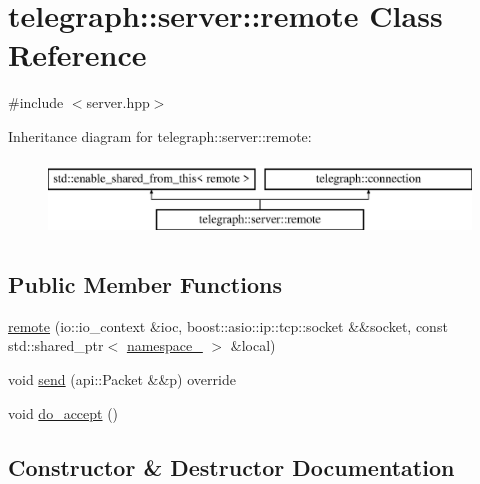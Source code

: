 \hypertarget{classtelegraph_1_1server_1_1remote}{}\section{telegraph\+:\+:server\+:\+:remote Class Reference}
\label{classtelegraph_1_1server_1_1remote}


{\ttfamily \#include $<$server.\+hpp$>$}

Inheritance diagram for telegraph\+:\+:server\+:\+:remote\+:\begin{figure}[H]
\begin{center}
\leavevmode
\includegraphics[height=2.000000cm]{classtelegraph_1_1server_1_1remote}
\end{center}
\end{figure}
\subsection*{Public Member Functions}
\begin{DoxyCompactItemize}
\item 
\hyperlink{classtelegraph_1_1server_1_1remote_a90eb5976be1536b518b89debfba36843}{remote} (io\+::io\+\_\+context \&ioc, boost\+::asio\+::ip\+::tcp\+::socket \&\&socket, const std\+::shared\+\_\+ptr$<$ \hyperlink{classtelegraph_1_1namespace__}{namespace\+\_\+} $>$ \&local)
\item 
void \hyperlink{classtelegraph_1_1server_1_1remote_aa6a2f2d4045ea8bb51938ca3da4e1b5e}{send} (api\+::\+Packet \&\&p) override
\item 
void \hyperlink{classtelegraph_1_1server_1_1remote_a10d60a8be9442784f3f1d63492835841}{do\+\_\+accept} ()
\end{DoxyCompactItemize}


\subsection{Constructor \& Destructor Documentation}
\mbox{\label{classtelegraph_1_1server_1_1remote_a90eb5976be1536b518b89debfba36843}} 
